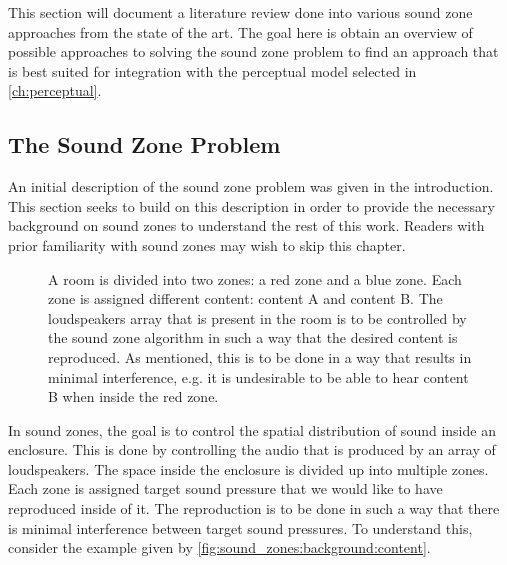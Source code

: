 This section will document a literature review done into various sound zone approaches from the state of the art.
The goal here is obtain an overview of possible approaches to solving the sound zone problem to find an approach that is best suited for integration with
the perceptual model selected in \autoref{ch:perceptual}.

\subsection{The Sound Zone Problem}
An initial description of the sound zone problem was given in the introduction.
This section seeks to build on this description in order to provide the necessary background on sound zones to understand the rest of this work.
Readers with prior familiarity with sound zones may wish to skip this chapter.

\begin{figure}[t]
    \centering
    \scalebox{1.0}{}
    \caption{A room is divided into two zones: a red zone and a blue zone.
        Each zone is assigned different content: content A and content B.
        The loudspeakers array that is present in the room is to be controlled by the sound zone algorithm 
        in such a way that the desired content is reproduced.
        As mentioned, this is to be done in a way that results in minimal interference, e.g. it is undesirable
        to be able to hear content B when inside the red zone.}
    \label{fig:sound_zones:background:content}
\end{figure}

In sound zones, the goal is to control the spatial distribution of sound inside an enclosure.
This is done by controlling the audio that is produced by an array of loudspeakers.
The space inside the enclosure is divided up into multiple zones.
Each zone is assigned target sound pressure that we would like to have reproduced inside of it.
The reproduction is to be done in such a way that there is minimal interference between target sound pressures.
To understand this, consider the example given by \autoref{fig:sound_zones:background:content}.

